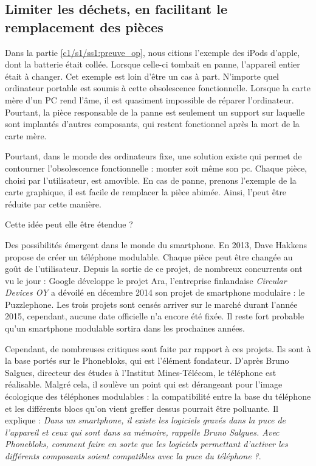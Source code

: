 \subsection{Limiter les déchets, en facilitant le remplacement des pièces }

Dans la partie \ref{c1/s1/ss1:preuve_op}, nous citions l'exemple des iPods d'apple, dont la batterie était collée. Lorsque celle-ci tombait en panne,  l'appareil entier était à changer. 
Cet exemple est loin d'être un cas à part. N'importe quel ordinateur portable est soumis à cette obsolescence fonctionnelle. Lorsque la carte mère d'un PC rend l'âme, il est quasiment impossible de réparer l'ordinateur. Pourtant, la pièce responsable de la panne est seulement un support sur laquelle sont implantés d'autres composants, qui restent fonctionnel après la mort de la carte mère.  

Pourtant, dans le monde des ordinateurs fixe, une solution existe qui permet de contourner l'obsolescence fonctionnelle : monter soit même son pc. Chaque pièce, choisi par l'utilisateur, est amovible. En cas de panne, prenons l'exemple de la carte graphique, il est facile de remplacer la pièce abimée. Ainsi, l'\op peut être réduite par cette manière. 


Cette idée peut elle être étendue ? 

\bigbreak

Des possibilités émergent dans le monde du smartphone. En 2013, Dave Hakkens propose de créer un téléphone modulable. Chaque pièce peut être changée au goût de l'utilisateur. Depuis la sortie de ce projet, de nombreux concurrents ont vu le jour : Google développe le projet Ara,  l'entreprise finlandaise \textit{Circular Devices OY} a dévoilé en décembre 2014 son projet de smartphone modulaire : le Puzzlephone. Les trois projets sont censés arriver sur le marché durant l'année 2015, cependant, aucune date officielle n'a encore été fixée. Il reste fort probable qu'un smartphone modulable sortira dans les prochaines années. 

Cependant, de nombreuses critiques sont faite par rapport à ces projets. Ils sont à la base portés sur le Phonebloks, qui est l'élément fondateur. D'après  Bruno Salgues\cite{phonebloks_critiques}, directeur des études à l'Institut Mines-Télécom, le téléphone est réalisable. Malgré cela, il soulève un point  qui est dérangeant pour l'image écologique des téléphones modulables : la compatibilité entre la base du téléphone et les différents blocs qu'on vient greffer dessus pourrait être polluante. Il explique : \og{}\textit{Dans un smartphone, il existe les logiciels gravés dans la puce de l’appareil et ceux qui sont dans sa mémoire, rappelle Bruno Salgues. Avec Phonebloks, comment faire en sorte que les logiciels permettant d'activer les différents composants soient compatibles avec la puce du téléphone ?}\fg{}. 

